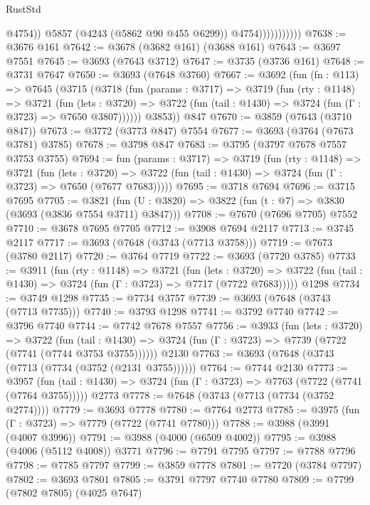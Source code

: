 \begin{lexlean}{RustStd}
\begin{coremodule}
                              @4754))
                          @5857
                          (@4243 (@5862 @90 @455 @6299))
                          @4754)))))))))))
@7638 := @3676 @161
@7642 := @3678 (@3682 @161) (@3688 @161)
@7643 := @3697 @7551
@7645 := @3693 (@7643 @3712)
@7647 := @3735 (@3736 @161)
@7648 := @3731 @7647
@7650 := @3693 (@7648 @3760)
@7667 := @3692
    (fun (fn : @113) =>
    @7645
      (@3715
        (@3718
          (fun (params : @3717) =>
          @3719
            (fun (rty : @1148) =>
            @3721
              (fun (lets : @3720) =>
              @3722 (fun (tail : @1430) => @3724 (fun (Γ : @3723) => @7650 @3807))))))
        @3853))
    @847
@7670 := @3859 (@7643 (@3710 @847))
@7673 := @3772 (@3773 @847) @7554
@7677 := @3693 (@3764 (@7673 @3781) @3785)
@7678 := @3798 @847
@7683 := @3795 (@3797 @7678 @7557 @3753 @3755)
@7694 := fun (params : @3717) =>
  @3719
    (fun (rty : @1148) =>
    @3721
      (fun (lets : @3720) =>
      @3722 (fun (tail : @1430) => @3724 (fun (Γ : @3723) => @7650 (@7677 @7683)))))
@7695 := @3718 @7694
@7696 := @3715 @7695
@7705 := @3821 (fun (U : @3820) => @3822 (fun (t : @7) => @3830 (@3693 (@3836 @7554 @3711) @3847)))
@7708 := @7670 (@7696 @7705) @7552
@7710 := @3678 @7695 @7705
@7712 := @3908 @7694 @2117
@7713 := @3745 @2117
@7717 := @3693 (@7648 (@3743 (@7713 @3758)))
@7719 := @7673 (@3780 @2117)
@7720 := @3764 @7719
@7722 := @3693 (@7720 @3785)
@7733 := @3911
    (fun (rty : @1148) =>
    @3721
      (fun (lets : @3720) =>
      @3722 (fun (tail : @1430) => @3724 (fun (Γ : @3723) => @7717 (@7722 @7683)))))
    @1298
@7734 := @3749 @1298
@7735 := @7734 @3757
@7739 := @3693 (@7648 (@3743 (@7713 @7735)))
@7740 := @3793 @1298
@7741 := @3792 @7740
@7742 := @3796 @7740
@7744 := @7742 @7678 @7557
@7756 := @3933
    (fun (lets : @3720) =>
    @3722
      (fun (tail : @1430) => @3724 (fun (Γ : @3723) => @7739 (@7722 (@7741 (@7744 @3753 @3755))))))
    @2130
@7763 := @3693 (@7648 (@3743 (@7713 (@7734 (@3752 (@2131 @3755))))))
@7764 := @7744 @2130
@7773 := @3957
    (fun (tail : @1430) => @3724 (fun (Γ : @3723) => @7763 (@7722 (@7741 (@7764 @3755)))))
    @2773
@7778 := @7648 (@3743 (@7713 (@7734 (@3752 @2774))))
@7779 := @3693 @7778
@7780 := @7764 @2773
@7785 := @3975 (fun (Γ : @3723) => @7779 (@7722 (@7741 @7780)))
@7788 := @3988 (@3991 (@4007 @3996))
@7791 := @3988 (@4000 (@6509 @4002))
@7795 := @3988 (@4006 (@5112 @4008)) @3771
@7796 := @7791 @7795
@7797 := @7788 @7796
@7798 := @7785 @7797
@7799 := @3859 @7778
@7801 := @7720 (@3784 @7797)
@7802 := @3693 @7801
@7805 := @3791 @7797 @7740 @7780
@7809 := @7799 (@7802 @7805) (@4025 @7647)

\end{coremodule}
\end{lexlean}
